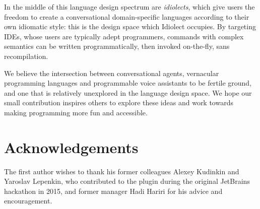\documentclass[conference]{IEEEtran}
\begin{document}
In the middle of this language design spectrum are \textit{idiolects}, which give users the freedom to create a conversational domain-specific languages according to their own idiomatic style: this is the design space which Idiolect occupies. By targeting IDEs, whose users are typically adept programmers, commands with complex semantics can be written programmatically, then invoked on-the-fly, sans recompilation.

We believe the intersection between conversational agents, vernacular programming languages and programmable voice assistants to be fertile ground, and one that is relatively unexplored in the language design space. We hope our small contribution inspires others to explore these ideas and work towards making programming more fun and accessible.

\section{Acknowledgements}

The first author wishes to thank his former colleagues Alexey Kudinkin and Yaroslav Lepenkin, who contributed to the plugin during the original JetBrains hackathon in 2015, and former manager Hadi Hariri for his advice and encouragement.


\end{document}
